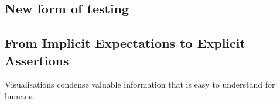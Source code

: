 \documentclass[acmsmall,screen,review,anonymous]{acmart}
\begin{document}




\subsection{New form of testing}


\subsection{From Implicit Expectations to Explicit Assertions}





Visualisations condense valuable information that is easy to understand for humans.
\end{document}
